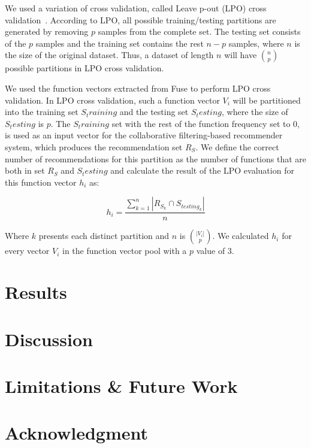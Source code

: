 \documentclass[conference]{IEEEtran}
\begin{document}
We used a variation of cross validation, called Leave p-out (LPO) cross validation~\cite{arlot2010survey}. According to LPO, all possible training/testing partitions are generated by removing $p$ samples from the complete set. The testing set consists of the $p$ samples and the training set contains the rest $n-p$ samples, where $n$ is the size of the original dataset. Thus, a dataset of length $n$ will have $n \choose p$ possible partitions in LPO cross validation.

We used the function vectors extracted from Fuse to perform LPO cross validation. In LPO cross validation, such a function vector $V_i$ will be partitioned into the training set $S_training$ and the testing set $S_testing$, where the size of $S_testing$ is $p$. The $S_training$ set with the rest of the function frequency set to 0, is used as an input vector for the collaborative filtering-based recommender system, which produces the recommendation set $R_S$. We define the correct number of recommendations for this partition as the number of functions that are both in set $R_S$ and $S_testing$ and calculate the result of the LPO evaluation for this function vector $h_i$ as:

\begin{center}
	\[
	h_i = \frac{\sum\limits_{k=1}^{n} |R_{S_k} \cap S_{{testing}_k}|}{n}
	\]
\end{center}

Where $k$ presents each distinct partition and $n$ is $|V_i|\choose p$. We calculated $h_i$ for every vector $V_i$ in the function vector pool with a $p$ value of 3.

\section{Results}

\section{Discussion}

\section{Limitations \& Future Work}

\section*{Acknowledgment}
\end{document}
